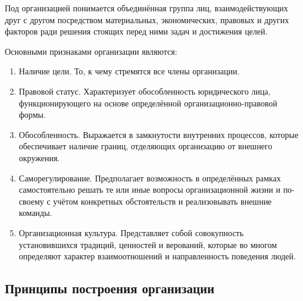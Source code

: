 \documentclass[12pt, russian, oneside, article]{ncc}
\begin{document}
Под организацией понимается объединённая группа лиц, взаимодействующих друг с другом посредством материальных, экономических, правовых и других факторов ради решения стоящих перед ними задач и достижения целей.

Основными признаками организации являются:
\begin{enumerate}
\item Наличие цели. То, к чему стремятся все члены организации.
\item Правовой статус. Характеризует обособленность юридического лица, функционирующего на основе определённой организационно-правовой формы.
\item Обособленность. Выражается в замкнутости внутренних процессов, которые обеспечивает наличие границ, отделяющих организацию от внешнего окружения.
\item Саморегулирование. Предполагает возможность в определённых рамках самостоятельно решать те или иные вопросы организационной жизни и по-своему с учётом конкретных обстоятельств и реализовывать внешние команды.
\item Организационная культура. Представляет собой совокупность установившихся традиций, ценностей и верований, которые во многом определяют характер взаимоотношений и направленность поведения людей.
\end{enumerate}
\subsection{Принципы построения организации}
\label{sec-5_2}
\end{document}

